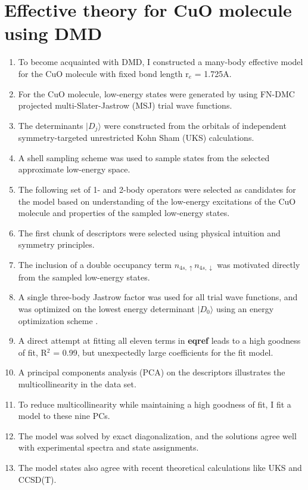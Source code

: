 \documentclass{article}
\begin{document}
\section{Effective theory for CuO molecule using DMD}
\begin{enumerate}
\item To become acquainted with DMD, I constructed a many-body effective model for the CuO molecule with fixed bond length r$_e$ = 1.725A.

\item For the CuO molecule, low-energy states were generated by using FN-DMC projected multi-Slater-Jastrow (MSJ) trial wave functions.

\item The determinants $|D_j \rangle$ were constructed from the orbitals of independent symmetry-targeted unrestricted Kohn Sham (UKS) calculations.

\item A shell sampling scheme was used to sample states from the selected approximate low-energy space. 

\item The following set of 1- and 2-body operators were selected as candidates for the model based on understanding of the low-energy excitations of the CuO molecule and properties of the sampled low-energy states.

\item The first chunk of descriptors were selected using physical intuition and symmetry principles.

\item The inclusion of a double occupancy term $n_{4s,\uparrow} n_{4s,\downarrow}$ was motivated directly from the sampled low-energy states.

\item A single three-body Jastrow factor was used for all trial wave functions, and was optimized on the lowest energy determinant $|D_0 \rangle$ using an energy optimization scheme \cite{Toulouse2007}.

\item A direct attempt at fitting all eleven terms in \textbf{eqref} leads to a high goodness of fit, R$^2$ = 0.99, but unexpectedly large coefficients for the fit model.

\item A principal components analysis (PCA) on the descriptors illustrates the multicollinearity in the data set.

\item To reduce multicollinearity while maintaining a high goodness of fit, I fit a model to these nine PCs.

\item The model was solved by exact diagonalization, and the solutions agree well with experimental spectra and state assignments.

\item The model states also agree with recent theoretical calculations like UKS and CCSD(T).
\end{enumerate}
\end{document}
